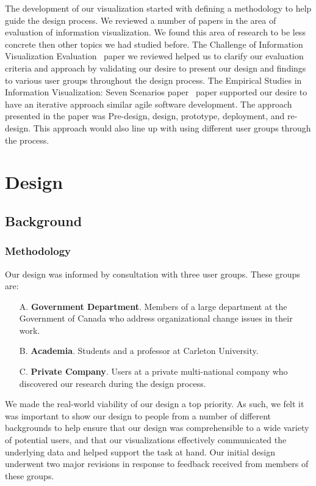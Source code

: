 \documentclass[journal]{vgtc}                %
\begin{document}
The development of our visualization started with defining a methodology to help guide the design process.  We reviewed a number of papers in the area of evaluation of information visualization.  We found this area of research to be less concrete then other topics we had studied before.  The Challenge of Information Visualization Evaluation~\cite{challengeofinfoviseval} paper we reviewed helped us to clarify our evaluation criteria and approach by validating our desire to present our design and findings to various user groups throughout the design process.  The Empirical Studies in Information Visualization: Seven Scenarios paper~\cite{lam2012empirical} paper supported our desire to have an iterative approach similar agile software development.  The approach presented in the paper was Pre-design, design, prototype, deployment, and re-design.  This approach would also line up with using different user groups through the process.

\section{Design}
\label{sec:design}

\subsection{Background}


\subsubsection{Methodology}
\label{sec:methodology}


Our design was informed by consultation with three user groups. These groups are:

\begin{enumerate}[label=(\alph*)]
	\item [A.] \textbf{Government Department}. Members of a large department at the Government of Canada who address organizational change issues in their work.
	\item [B.] \textbf{Academia}. Students and a professor at Carleton University.
	\item [C.] \textbf{Private Company}. Users at a private multi-national company who discovered our research during the design process.
        \end{enumerate}

        We made the real-world viability of our design a top priority. As such, we felt it was important to show our design to people from a number of different backgrounds to help ensure that our design was comprehensible to a wide variety of potential users, and that our visualizations effectively communicated the underlying data and helped support the task at hand. Our initial design underwent two major revisions in response to feedback received from members of these groups. 
\end{document}

